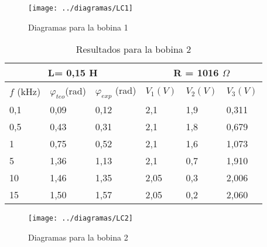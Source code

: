 \documentclass[a4paper,12pt,spanish]{article}
\begin{document}
\begin{figure}[H]
	\centering
	\texttt{[image: ../diagramas/LC1]}
	\caption{Diagramas para la bobina 1}
	\label{fig:montaje}
\end{figure}



\begin{table}[H]
	\centering
	\begin{tabular}{|lll|lll|}
		\hline
		\multicolumn{3}{|c|}{L= 0,15 H}                                                                      & \multicolumn{3}{c|}{R = 1016 $\Omega$}                                \\ \hline
		\multicolumn{1}{|l|}{$f$ (kHz)} & \multicolumn{1}{l|}{$\varphi_{teo}$(rad)} & $\varphi_{exp}$ (rad) & \multicolumn{1}{l|}{$V_1 (\si{V})$}  & \multicolumn{1}{l|}{$V_2 (\si{V})$}    & $V_3 (\si{V})$ \\ \hline
		\multicolumn{1}{|l|}{0,1}     & \multicolumn{1}{l|}{0,09}                 & 0,12                     & \multicolumn{1}{l|}{2,1}  & \multicolumn{1}{l|}{1,9} & 0,311       \\ \hline
		\multicolumn{1}{|l|}{0,5}     & \multicolumn{1}{l|}{0,43}                 & 0,31                     & \multicolumn{1}{l|}{2,1}  & \multicolumn{1}{l|}{1,8} & 0,679       \\ \hline
		\multicolumn{1}{|l|}{1}       & \multicolumn{1}{l|}{0,75}                 & 0,52                     & \multicolumn{1}{l|}{2,1}  & \multicolumn{1}{l|}{1,6} & 1,073       \\ \hline
		\multicolumn{1}{|l|}{5}       & \multicolumn{1}{l|}{1,36}                 & 1,13                     & \multicolumn{1}{l|}{2,1}  & \multicolumn{1}{l|}{0,7} & 1,910       \\ \hline
		\multicolumn{1}{|l|}{10}      & \multicolumn{1}{l|}{1,46}                 & 1,35                     & \multicolumn{1}{l|}{2,05} & \multicolumn{1}{l|}{0,3} & 2,006      \\ \hline
		\multicolumn{1}{|l|}{15}      & \multicolumn{1}{l|}{1,50}                 & 1,57                     & \multicolumn{1}{l|}{2,05} & \multicolumn{1}{l|}{0,2} & 2,060      \\ \hline
	\end{tabular}
	\caption{Resultados para la bobina 2}
	\label{tab:my-table}
\end{table}

\begin{figure}[H]
	\centering
	\texttt{[image: ../diagramas/LC2]}
	\caption{Diagramas para la bobina 2}
	\label{fig:montaje}
\end{figure}
\end{document}

